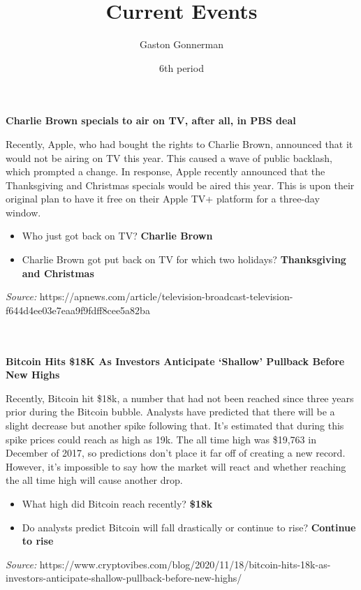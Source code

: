 \documentclass{article}
\title{Current Events}
\author{Gaston Gonnerman}
\date{6th period}
\begin{document}
	\maketitle
	
	\begin{center}
		\large{
			\textbf{Charlie Brown specials to air on TV, after all, in PBS deal}
		}
	\end{center}
	\par Recently, Apple, who had bought the rights to Charlie Brown, announced that it would not be airing on TV this year. This caused a wave of public backlash, which prompted a change. In response, Apple recently announced that the Thanksgiving and Christmas specials would be aired this year. This is upon their original plan to have it free on their Apple TV+ platform for a three-day window.
	
	\begin{itemize}[label=--]
		\item Who just got back on TV? \textbf{Charlie Brown}
		\item Charlie Brown got put back on TV for which two holidays? \textbf{Thanksgiving and Christmas}
	\end{itemize}

	\noindent
	\emph{Source:} https://apnews.com/article/television-broadcast-television-f644d4ee03e7eaa9f9fdff8cee5a82ba
	\\ \\ \\
	
	\begin{center}
		\large{
			\textbf{Bitcoin Hits \$18K As Investors Anticipate ‘Shallow’ Pullback Before New Highs}
		}
	\end{center}
	\par Recently, Bitcoin hit \$18k, a number that had not been reached since three years prior during the Bitcoin bubble. Analysts have predicted that there will be a slight decrease but another spike following that. It's estimated that during this spike prices could reach as high as 19k. The all time high was \$19,763 in December of 2017, so predictions don't place it far off of creating a new record. However, it's impossible to say how the market will react and whether reaching the all time high will cause another drop.
	
	\begin{itemize}[label=--]
		\item What high did Bitcoin reach recently? \textbf{\$18k}
		\item Do analysts predict Bitcoin will fall drastically or continue to rise? \textbf{Continue to rise}
	\end{itemize}

	\noindent
	\emph{Source:} https://www.cryptovibes.com/blog/2020/11/18/bitcoin-hits-18k-as-investors-anticipate-shallow-pullback-before-new-highs/
\end{document}
